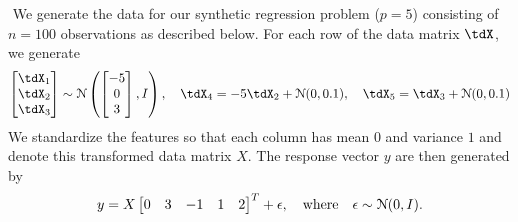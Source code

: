 $ $\newline
We generate the data for our synthetic regression problem ($p=5$) consisting of $n=100$ observations as described below. For each row of the data matrix $\tdX$, we generate
\[
\begin{bmatrix} \tdX_1 \\ \tdX_2 \\ \tdX_3 \end{bmatrix} \sim \distNorm \left( \begin{bmatrix} -5 \\ 0 \\ 3 \end{bmatrix}, I \right), \quad \tdX_4 = -5\tdX_2 + \distNorm(0, 0.1), \quad \tdX_5 = \tdX_3 + \distNorm(0, 0.1)
\]
We standardize the features so that each column has mean $0$ and variance $1$ and denote this transformed data matrix $X$. The response vector $y$ are then generated by
\[
y = X\begin{bmatrix} 0 & 3 & -1 & 1 & 2 \end{bmatrix}^T + \epsilon, \quad \text{where} \quad \epsilon \sim \mathcal{N}(0, I).
\]

%
%
